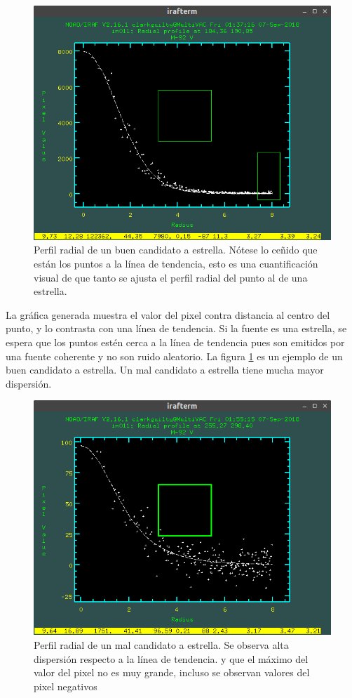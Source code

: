 \documentclass[12pt]{article}
\begin{document}
\begin{figure}[H]
  \centering
   \includegraphics[scale= 0.6]{im05.png}
  \caption{Perfil radial de un buen candidato a estrella. Nótese lo ceñido que están los puntos a la línea de tendencia, esto es una cuantificación visual de que tanto se ajusta el perfil radial del punto al de una estrella.}
  \label{im05}
\end{figure}

La gráfica generada muestra el valor del pixel contra distancia al centro del punto, y lo contrasta con una línea de tendencia. Si la fuente es una estrella, se espera que los puntos estén cerca a la línea de tendencia pues son emitidos por una fuente coherente y no son ruido aleatorio. La figura \ref{im05} es un ejemplo de un buen candidato a estrella. Un mal candidato a estrella tiene mucha mayor dispersión. 



\begin{figure}[H]
  \centering
   \includegraphics[scale= 0.6]{im06.png}
  \caption{Perfil radial de un mal candidato a estrella. Se observa alta dispersión respecto a la línea de tendencia. y que el máximo del valor del pixel no es muy grande, incluso se observan valores del pixel negativos}
  \label{im06}
\end{figure}
\end{document}
